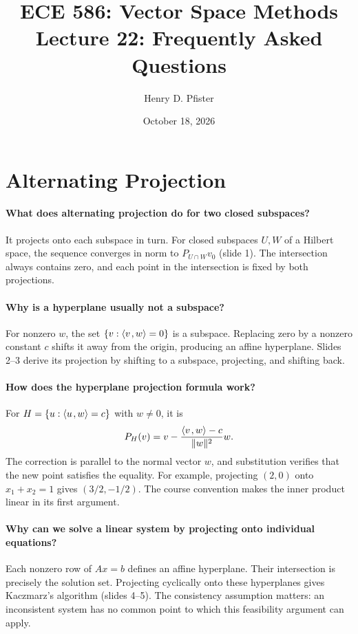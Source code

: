 \documentclass[10pt,english]{article}
\begin{document}
\title{ECE 586: Vector Space Methods \\ Lecture 22: Frequently Asked Questions}
\author{Henry D. Pfister \\ \univ}
\date{October 18, 2026}

\maketitle

\section{Alternating Projection}

\paragraph{What does alternating projection do for two closed subspaces?}
It projects onto each subspace in turn.
For closed subspaces $U,W$ of a Hilbert space, the sequence converges in norm to $P_{U\cap W}v_0$ (slide 1).
The intersection always contains zero, and each point in the intersection is fixed by both projections.

\paragraph{Why is a hyperplane usually not a subspace?}
For nonzero $w$, the set $\{v:{\left\langle v \mskip2mu , w \right\rangle}=0\}$ is a subspace.
Replacing zero by a nonzero constant $c$ shifts it away from the origin, producing an affine hyperplane.
Slides 2--3 derive its projection by shifting to a subspace, projecting, and shifting back.

\paragraph{How does the hyperplane projection formula work?}
For $H=\{u:{\left\langle u \mskip2mu , w \right\rangle}=c\}$ with $w\neq0$, it is
\[
P_H(v)=v-\frac{{\left\langle v \mskip2mu , w \right\rangle}-c}{\|w\|^2}w.
\]
The correction is parallel to the normal vector $w$, and substitution verifies that the new point satisfies the equality.
For example, projecting $(2,0)$ onto $x_1+x_2=1$ gives $(3/2,-1/2)$.
The course convention makes the inner product linear in its first argument.

\paragraph{Why can we solve a linear system by projecting onto individual equations?}
Each nonzero row of $Ax=b$ defines an affine hyperplane.
Their intersection is precisely the solution set.
Projecting cyclically onto these hyperplanes gives Kaczmarz's algorithm (slides 4--5).
The consistency assumption matters: an inconsistent system has no common point to which this feasibility argument can apply.
\end{document}
